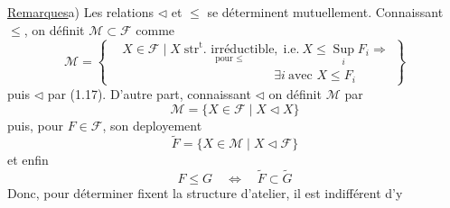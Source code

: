 \uline{Remarques}\quad a) Les relations $\triangleleft$ et $\leq$ se déterminent mutuellement. Connaissant $\leq$, on définit $\mathcal{M}\subset\mathcal{F}$ comme
\[
\mathcal{M}=\left\{\begin{aligned}
&X\in\mathcal{F}\mid X\;
\underset{\text{pour }\leq}{\text{$\mathrm{str}^{\mathrm{t}}$. irréductible}},\;
\text{i.e.}\ X\leq\mathop{\mathrm{Sup}}\limits_i F_i\Rightarrow\\
&\hspace{12em}\exists i\ \text{avec }X\leq F_i
\end{aligned}\right\}
\tag*{(1.20)}
\]
puis $\triangleleft$ par (1.17).
 D'autre part, connaissant $\triangleleft$ on définit $\mathcal{M}$ par
\[
\mathcal{M}=\{X\in\mathcal{F}\mid X\triangleleft X\} \tag*{(1.21)}
\]
puis, pour $F\in\mathcal{F}$, son deployement
\[
\widetilde F=\{X\in\mathcal{M}\mid X\triangleleft\mathcal{F}\} \tag*{(1.22)}
\]
et enfin
\[
F\leq G\quad\Longleftrightarrow\quad\widetilde F\subset\widetilde G \tag*{(1,23)}
\]
Donc, pour déterminer   fixent la structure d'atelier, il est indifférent d'y

